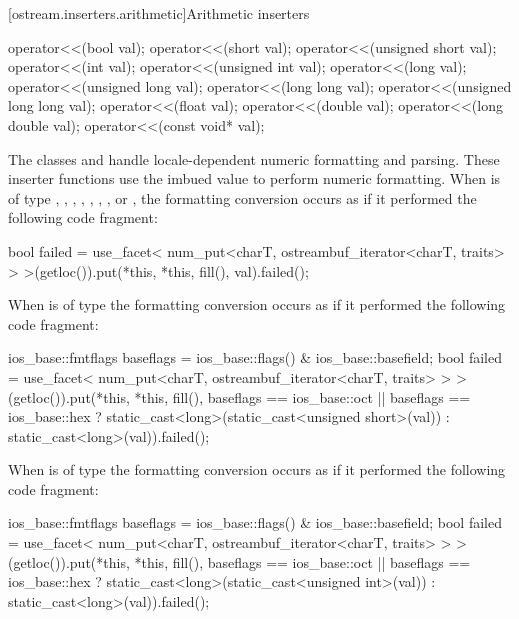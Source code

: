 [ostream.inserters.arithmetic]{Arithmetic inserters}

%
%
\begin{itemdecl}
operator<<(bool val);
operator<<(short val);
operator<<(unsigned short val);
operator<<(int val);
operator<<(unsigned int val);
operator<<(long val);
operator<<(unsigned long val);
operator<<(long long val);
operator<<(unsigned long long val);
operator<<(float val);
operator<<(double val);
operator<<(long double val);
operator<<(const void* val);
\end{itemdecl}

\begin{itemdescr}
\pnum
\effects
The classes
and
handle locale-dependent numeric formatting and
parsing.
These inserter functions use the imbued
value to perform numeric formatting.
When 
is of type
,
,
,
, ,
,
,
or
,
the formatting conversion occurs as if it performed the following code fragment:
\begin{codeblock}
bool failed = use_facet<
  num_put<charT, ostreambuf_iterator<charT, traits> >
    >(getloc()).put(*this, *this, fill(), val).failed();
\end{codeblock}

When  is of type
the formatting conversion occurs as if it performed the following code fragment:
\begin{codeblock}
ios_base::fmtflags baseflags = ios_base::flags() & ios_base::basefield;
bool failed = use_facet<
  num_put<charT, ostreambuf_iterator<charT, traits> >
    >(getloc()).put(*this, *this, fill(),
    baseflags == ios_base::oct || baseflags == ios_base::hex
      ? static_cast<long>(static_cast<unsigned short>(val))
      : static_cast<long>(val)).failed();
\end{codeblock}

When  is of type
the formatting conversion occurs as if it performed the following code fragment:
\begin{codeblock}
ios_base::fmtflags baseflags = ios_base::flags() & ios_base::basefield;
bool failed = use_facet<
  num_put<charT, ostreambuf_iterator<charT, traits> >
    >(getloc()).put(*this, *this, fill(),
    baseflags == ios_base::oct || baseflags == ios_base::hex
      ? static_cast<long>(static_cast<unsigned int>(val))
      : static_cast<long>(val)).failed();
\end{codeblock}


\end{itemdescr}
